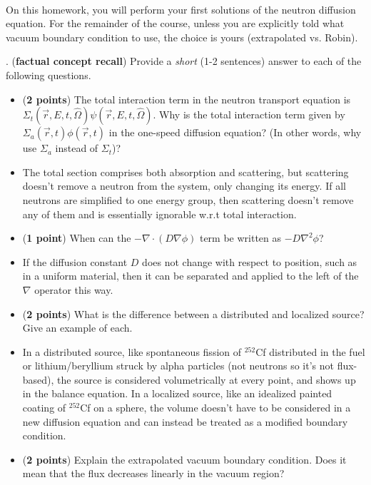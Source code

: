 \documentclass[11pt]{article}
\newcommand{\hO}{\hat{\Omega}}
\newcommand{\ans}[1]{{\color{violet}#1}}
\begin{document}
\\

\begin{tcolorbox}
On this homework, you will perform your first solutions of the neutron diffusion equation. For the remainder of the course, unless you are explicitly told what vacuum boundary condition to use, the choice is yours (extrapolated vs. Robin).
\end{tcolorbox}
\vspace{2cm}

. ({\bf factual concept recall}) Provide a {\it short} (1-2 sentences) answer to each of the following questions.

\begin{itemize}
\item[(a)] ({\bf 2 points}) The total interaction term in the neutron transport equation is $\Sigma_t(\vec{r},E,t,\hO)\psi(\vec{r},E,t,\hO)$. Why is the total interaction term given by $\Sigma_a(\vec{r},t)\phi(\vec{r},t)$ in the one-speed diffusion equation? (In other words, why use $\Sigma_a$ instead of $\Sigma_t$)?
\item[] \ans{The total section comprises both absorption and scattering, but scattering doesn't remove a neutron from the system, only changing its energy.
If all neutrons are simplified to one energy group, then scattering doesn't remove any of them and is essentially ignorable w.r.t total interaction.}
\item[(b)] ({\bf 1 point}) When can the $-\nabla\cdot (D\nabla\phi)$ term be written as $-D\nabla^2\phi$?
\item[] \ans{If the diffusion constant $D$ does not change with respect to position, such as in a uniform material, then it can be separated and applied to the left of the $\nabla$ operator this way.}
\item[(c)] ({\bf 2 points}) What is the difference between a distributed and localized source? Give an example of each.
\item[] \ans{In a distributed source, like spontaneous fission of $^{252}$Cf distributed in the fuel or lithium/beryllium struck by alpha particles (not neutrons so it's not flux-based), the source is considered volumetrically at every point, and shows up in the balance equation. In a localized source, like an idealized painted coating of $^{252}$Cf on a sphere, the volume doesn't have to be considered in a new diffusion equation and can instead be treated as a modified boundary condition.}
\item[(d)] ({\bf 2 points}) Explain the extrapolated vacuum boundary condition. Does it mean that the flux decreases linearly in the vacuum region?

\end{itemize}
\end{document}
